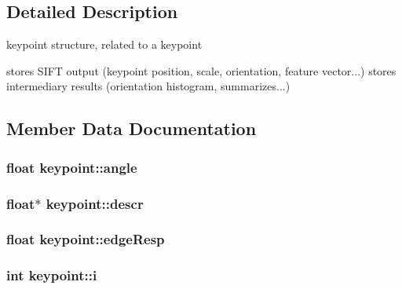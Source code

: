 \subsection{Detailed Description}
keypoint structure, related to a keypoint 

stores S\+I\+F\+T output (keypoint position, scale, orientation, feature vector...) stores intermediary results (orientation histogram, summarizes...) 

\subsection{Member Data Documentation}
\hypertarget{structkeypoint_a0b7769f18cfb22ef2f1f0080e94766a2}{}
\subsubsection[{angle}]{\setlength{\rightskip}{0pt plus 5cm}float keypoint\+::angle}\label{structkeypoint_a0b7769f18cfb22ef2f1f0080e94766a2}
\hypertarget{structkeypoint_a6351f2037074aaa034a806d4b4aabd7d}{}
\subsubsection[{descr}]{\setlength{\rightskip}{0pt plus 5cm}float$\ast$ keypoint\+::descr}\label{structkeypoint_a6351f2037074aaa034a806d4b4aabd7d}
\hypertarget{structkeypoint_a6d0bf466b67b0757e092a752bb55df6d}{}
\subsubsection[{edge\+Resp}]{\setlength{\rightskip}{0pt plus 5cm}float keypoint\+::edge\+Resp}\label{structkeypoint_a6d0bf466b67b0757e092a752bb55df6d}
\hypertarget{structkeypoint_ad7b1c8ac0d3ca4d18c5fd749661c0247}{}
\subsubsection[{i}]{\setlength{\rightskip}{0pt plus 5cm}int keypoint\+::i}\label{structkeypoint_ad7b1c8ac0d3ca4d18c5fd749661c0247}
\hypertarget{structkeypoint_aefbddee300af560947f4c370ebabf72a}{}
